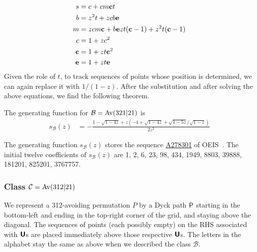 \documentclass[12pt, a4paper, twoside]{report}
\begin{document}
\begin{align*}
s &= c + cm\mathbf{c} t\\
b &= z^2t + zcb\mathbf{e}\\
m &= zcm\mathbf{c} + b\mathbf{e} zt(\mathbf{c} -1) + z^2t(\mathbf{c} -1)\\
c &= 1+zc^2\\
\mathbf{c} &= 1+ zt\mathbf{c}^2\\
\mathbf{e} &= 1+zt\mathbf{e}
\end{align*}
Given the role of $t$, to track sequences of points whose position is determined, we can again replace it with $1/(1-z)$. After the substitution and after solving the above equations, we find the following theorem.
\begin{theorem}
The generating function for $\mathcal{B} = \mathrm{Av}(321|21)$ is 
\begin{align*}
  s_{\mathcal{B}}(z) &= -\frac{1-\sqrt{1-4z} + z(-4+\sqrt{1-4z} + \sqrt{1-5z}/\sqrt{1-z})}{2z^2}
\end{align*}
\end{theorem}

The generating function $s_{\mathcal{B}}(z)$ stores the sequence \href{http://oeis.org/A278301}{A278301} of OEIS~\cite{oeis}. The initial twelve coefficients of $s_{\mathcal{B}}(z)$ are 1, 2, 6, 23, 98, 434, 1949, 8803, 39888, 181201, 825201, 3767757.

\subsubsection{Class $\mathcal{C} = \mathrm{Av}(312|21)$}
\label{sec:classC}
We represent a 312-avoiding permutation $P$ by a Dyck path $\textsf{P}$ starting in the bottom-left and ending in the top-right corner of the grid, and staying above the diagonal. The sequences of points (each possibly empty) on the RHS associated with $\textbf{\textsf{U}}$s are placed immediately above those respective $\textbf{\textsf{U}}$s. The letters in the alphabet stay the same as above when we described the class $\mathcal{B}$.
\end{document}
